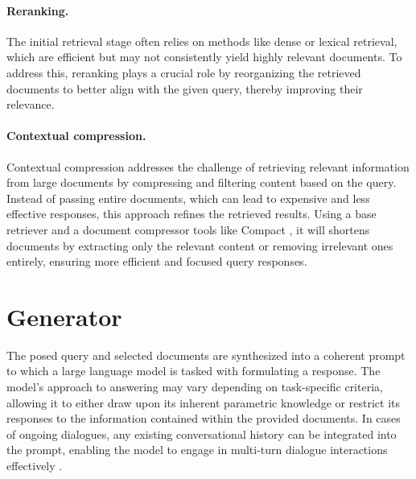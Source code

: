 \paragraph*{Reranking.} The initial retrieval stage often relies on methods like dense or lexical retrieval, which are efficient but may not consistently yield highly relevant documents. To address this, reranking plays a crucial role by reorganizing the retrieved documents to better align with the given query, thereby improving their relevance.\\

\paragraph*{Contextual compression.} Contextual compression addresses the challenge of retrieving relevant information from large documents by compressing and filtering content based on the query. Instead of passing entire documents, which can lead to expensive and less effective responses, this approach refines the retrieved results. Using a base retriever and a document compressor tools like Compact \cite{yoon2024compact}, it will shortens documents by extracting only the relevant content or removing irrelevant ones entirely, ensuring more efficient and focused query responses.

\section{Generator}

The posed query and selected documents are synthesized into a coherent prompt to which a large language model is tasked with formulating a response. The model’s approach to answering may vary depending on task-specific criteria, allowing it to either draw upon its inherent parametric knowledge or restrict its responses to the information contained within the provided documents. In cases of ongoing dialogues, any existing conversational history can be integrated into the prompt, enabling the model to engage in multi-turn dialogue interactions effectively  \cite{gao2023ragllmsurvey}.


